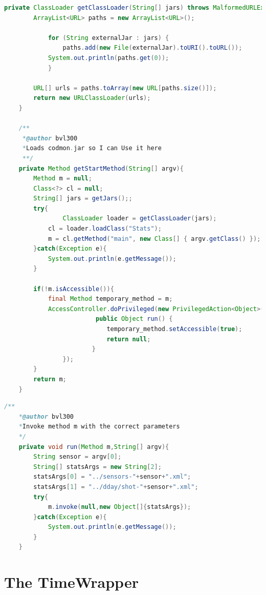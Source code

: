 \documentclass{article}
\begin{document}
\begin{lstlisting}[frame=single ,language=Java]
private ClassLoader getClassLoader(String[] jars) throws MalformedURLException, SecurityException{
		ArrayList<URL> paths = new ArrayList<URL>();

     		for (String externalJar : jars) {
         		paths.add(new File(externalJar).toURI().toURL());
			System.out.println(paths.get(0));
     		}
     		
		URL[] urls = paths.toArray(new URL[paths.size()]);
		return new URLClassLoader(urls);
	}	

	/**
	 *@author bvl300
	 *Loads codmon.jar so I can Use it here
	 **/
	private Method getStartMethod(String[] argv){	
		Method m = null;
		Class<?> cl = null;
		String[] jars = getJars();;
		try{
		        ClassLoader loader = getClassLoader(jars);
			cl = loader.loadClass("Stats");
			m = cl.getMethod("main", new Class[] { argv.getClass() });
		}catch(Exception e){
			System.out.println(e.getMessage());
		}

		if(!m.isAccessible()){
			final Method temporary_method = m;
			AccessController.doPrivileged(new PrivilegedAction<Object>() {
            			 public Object run() {
               		  		temporary_method.setAccessible(true);
                 			return null;
             			}
         		});
		}
		return m;
	} 
\end{lstlisting} 
\newpage
{}
\begin{lstlisting}[frame=single ,language=Java]
	/**
 	*@author bvl300
 	*Invoke method m with the correct parameters
 	*/ 
	private void run(Method m,String[] argv){
		String sensor = argv[0];
		String[] statsArgs = new String[2];
		statsArgs[0] = "../sensors-"+sensor+".xml";
		statsArgs[1] = "../dday/shot-"+sensor+".xml";
		try{
			m.invoke(null,new Object[]{statsArgs});
		}catch(Exception e){
			System.out.println(e.getMessage());
		}
	}
\end{lstlisting}  

\newpage
\section{The TimeWrapper}
\label{AppendixB}
\end{document}
